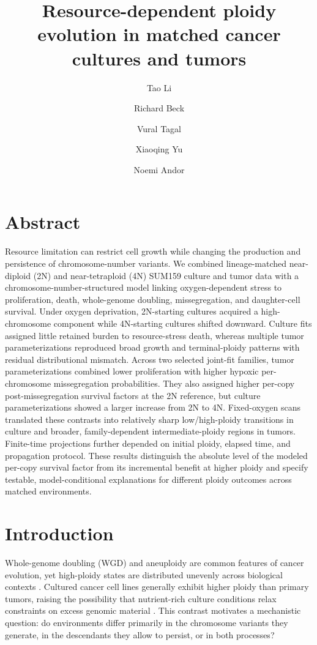 \documentclass[11pt]{article}
\title{Resource-dependent ploidy evolution in matched cancer cultures and tumors}
\author[1,$\dagger$]{Tao Li}
\author[1,$\dagger$]{Richard Beck}
\author[1]{Vural Tagal}
\author[2]{Xiaoqing Yu}
\author[1,*]{Noemi Andor}
\affil[1]{H. Lee Moffitt Cancer Center \& Research Institute, Tampa, FL, USA}
\affil[2]{ \footnotesize Department of Biostatistics and Bioinformatics, H Lee Moffitt Cancer Center and Research Institute, Tampa, FL, USA}
\affil[$\dagger$]{These authors contributed equally to this work.}
\date{}
\let\cite\supercite
\begin{document}
\maketitle

\section*{Abstract}

Resource limitation can restrict cell growth while changing the production and persistence of chromosome-number variants. We combined lineage-matched near-diploid (2N) and near-tetraploid (4N) SUM159 culture and tumor data with a chromosome-number-structured model linking oxygen-dependent stress to proliferation, death, whole-genome doubling, missegregation, and daughter-cell survival. Under oxygen deprivation, 2N-starting cultures acquired a high-chromosome component while 4N-starting cultures shifted downward. Culture fits assigned little retained burden to resource-stress death, whereas multiple tumor parameterizations reproduced broad growth and terminal-ploidy patterns with residual distributional mismatch. Across two selected joint-fit families, tumor parameterizations combined lower proliferation with higher hypoxic per-chromosome missegregation probabilities. They also assigned higher per-copy post-missegregation survival factors at the 2N reference, but culture parameterizations showed a larger increase from 2N to 4N. Fixed-oxygen scans translated these contrasts into relatively sharp low/high-ploidy transitions in culture and broader, family-dependent intermediate-ploidy regions in tumors. Finite-time projections further depended on initial ploidy, elapsed time, and propagation protocol. These results distinguish the absolute level of the modeled per-copy survival factor from its incremental benefit at higher ploidy and specify testable, model-conditional explanations for different ploidy outcomes across matched environments.

\section*{Introduction}

Whole-genome doubling (WGD) and aneuploidy are common features of cancer evolution, yet high-ploidy states are distributed unevenly across biological contexts \cite{bielski_genome_2018,davoli_tumor_2017,salehi_clonal_2021}. Cultured cancer cell lines generally exhibit higher ploidy than primary tumors, raising the possibility that nutrient-rich culture conditions relax constraints on excess genomic material \cite{nowicka_interactions_2025,beck_energetics_2025}. This contrast motivates a mechanistic question: do environments differ primarily in the chromosome variants they generate, in the descendants they allow to persist, or in both processes?
\end{document}
